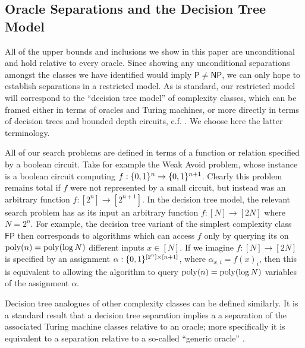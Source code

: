 \subsection{Oracle Separations and the Decision Tree Model}
\label{prelim:querymodels}

All of the upper bounds and inclusions we show in this paper are unconditional and hold relative to every oracle. Since showing any unconditional separations amongst the classes we have identified would imply $\mathsf{P} \neq \mathsf{NP}$, we can only hope to establish separations in a restricted model. As is standard, our restricted model will correspond to the ``decision tree model'' of complexity classes, which can be framed either in terms of oracles and Turing machines, or more directly in terms of decision trees and bounded depth circuits, c.f. \cite{cook}. We choose here the latter terminology. 

All of our search problems are defined in terms of a function or relation specified by a boolean circuit. Take for example the {\sc Weak Avoid} problem, whose instance is a boolean circuit computing $f: \{0,1\}^n \to \{0,1\}^{n+1}$. Clearly this problem remains total if $f$ were not represented by a small circuit, but instead was an arbitrary function $f: [2^n] \to [2^{n+1}]$. In the decision tree model, the relevant search problem has as its input an arbitrary function $f: [N] \to [2N]$ where $N = 2^n$. For example, the decision tree variant of the simplest complexity class $\mathsf{FP}$ then corresponds to algorithms which can access $f$ only by querying its on $\mathrm{poly}(n) = \mathrm{poly}(\log N)$ different inputs $x \in [N]$. If we imagine $f: [N] \to [2N]$ is specified by an assignment $\alpha: \{0,1\}^{[2^n] \times [n+1]}$, where $\alpha_{x,i} = f(x)_i$, then this is equivalent to allowing the algorithm to query $\mathrm{poly}(n)=\mathrm{poly}(\log N)$ variables of the assignment $\alpha$. 

Decision tree analogues of other complexity classes can be defined similarly. It is a standard result that a decision tree separation implies a a separation of the associated Turing machine classes relative to an oracle; more specifically it is equivalent to a separation relative to a so-called ``generic oracle'' \cite{BeameCEIP98}.

